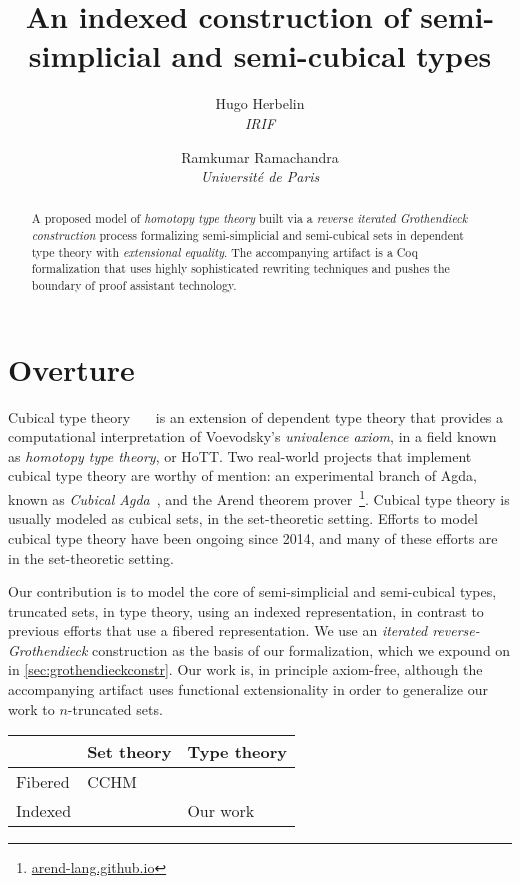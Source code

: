 \documentclass[10pt]{art}
\title{An indexed construction of semi-simplicial and semi-cubical types}
\author{
  \textcolor{gray80}{Hugo Herbelin} \\
  \itshape \textcolor{gray80}{IRIF}
  \and
  \textcolor{gray80}{Ramkumar Ramachandra} \\
  \itshape \textcolor{gray80}{Université de Paris}
}
\date{}
\begin{document}
\thispagestyle{empty}
\maketitle
\begin{abstract}
  A proposed model of \emph{homotopy type theory} built via a \emph{reverse iterated Grothendieck construction} process formalizing semi-simplicial and semi-cubical sets in dependent type theory with \emph{extensional equality}. The accompanying artifact is a Coq formalization that uses highly sophisticated rewriting techniques and pushes the boundary of proof assistant technology.
\end{abstract}
\tableofcontents
\newpage

\section{Overture}
Cubical type theory~\cite{Bezem14}~\cite{Cohen16}~\cite{Angiuli17} is an extension of dependent type theory that provides a computational interpretation of Voevodsky's \emph{univalence axiom}, in a field known as \emph{homotopy type theory}, or HoTT. Two real-world projects that implement cubical type theory are worthy of mention: an experimental branch of Agda, known as \emph{Cubical Agda}~\cite{Vezzosi21}, and the Arend theorem prover~\footnote{\href{https://arend-lang.github.io}{arend-lang.github.io}}. Cubical type theory is usually modeled as cubical sets, in the set-theoretic setting. Efforts to model cubical type theory have been ongoing since 2014, and many of these efforts are in the set-theoretic setting.

Our contribution is to model the core of semi-simplicial and semi-cubical types, truncated sets, in type theory, using an indexed representation, in contrast to previous efforts that use a fibered representation. We use an \emph{iterated reverse-Grothendieck} construction as the basis of our formalization, which we expound on in \ref{sec:grothendieckconstr}. Our work is, in principle axiom-free, although the accompanying artifact uses functional extensionality in order to generalize our work to $n$-truncated sets.

\begin{table}[H]
  \begin{tabularx}{\linewidth}{p{.3\linewidth}|p{.3\linewidth}|p{.3\linewidth}}
    \toprule
            & Set theory & Type theory \\
    \midrule
    Fibered & CCHM       &             \\
    \midrule
    Indexed &            & Our work    \\
    \bottomrule
  \end{tabularx}
\end{table}
\end{document}

